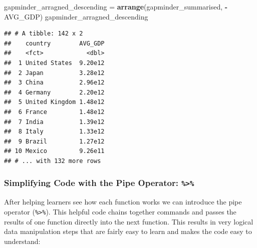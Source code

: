 \documentclass[]{book}
\newenvironment{Shaded}{\begin{snugshade}}{\end{snugshade}}
\newcommand{\DataTypeTok}[1]{\textcolor[rgb]{0.13,0.29,0.53}{#1}}
\newcommand{\DecValTok}[1]{\textcolor[rgb]{0.00,0.00,0.81}{#1}}
\newcommand{\KeywordTok}[1]{\textcolor[rgb]{0.13,0.29,0.53}{\textbf{#1}}}
\newcommand{\NormalTok}[1]{#1}
\newcommand{\OperatorTok}[1]{\textcolor[rgb]{0.81,0.36,0.00}{\textbf{#1}}}
\newcommand{\StringTok}[1]{\textcolor[rgb]{0.31,0.60,0.02}{#1}}
\begin{document}
\begin{Shaded}
\begin{Highlighting}[]
\NormalTok{gapminder_arragned_descending =}\StringTok{ }\KeywordTok{arrange}\NormalTok{(gapminder_summarised, }\OperatorTok{-}\NormalTok{AVG_GDP)}
\NormalTok{gapminder_arragned_descending}
\end{Highlighting}
\end{Shaded}

\begin{verbatim}
## # A tibble: 142 x 2
##    country        AVG_GDP
##    <fct>            <dbl>
##  1 United States  9.20e12
##  2 Japan          3.28e12
##  3 China          2.96e12
##  4 Germany        2.20e12
##  5 United Kingdom 1.48e12
##  6 France         1.48e12
##  7 India          1.39e12
##  8 Italy          1.33e12
##  9 Brazil         1.27e12
## 10 Mexico         9.26e11
## # ... with 132 more rows
\end{verbatim}

\hypertarget{simplifying-code-with-the-pipe-operator}{%
\subsubsection{\texorpdfstring{Simplifying Code with the Pipe Operator: \texttt{\%\textgreater{}\%}}{Simplifying Code with the Pipe Operator: \%\textgreater\%}}\label{simplifying-code-with-the-pipe-operator}}

After helping learners see how each function works we can introduce the pipe operator (\texttt{\%\textgreater{}\%}). This helpful code chains together commands and passes the results of one function directly into the next function. This results in very logical data manipulation steps that are fairly easy to learn and makes the code easy to understand:

\begin{Shaded}
\end{Shaded}
\end{document}
